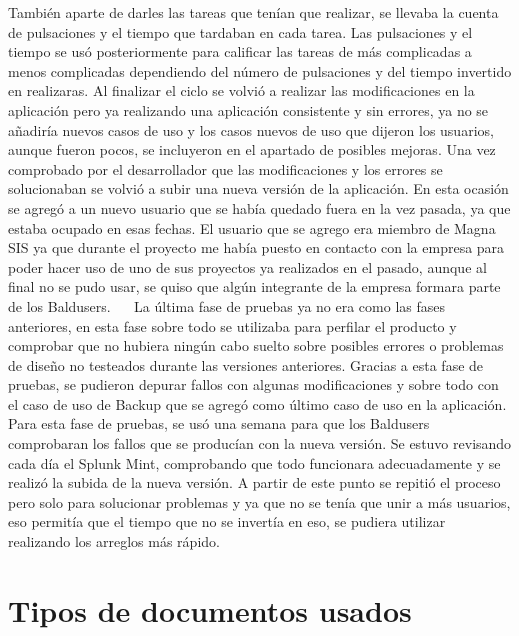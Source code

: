 También aparte de darles las tareas que tenían que realizar, se llevaba la cuenta de pulsaciones y el tiempo que tardaban en cada tarea.
Las pulsaciones y el tiempo se usó posteriormente para calificar las tareas de más complicadas a menos complicadas dependiendo del número de pulsaciones y del tiempo invertido en realizaras.
Al finalizar el ciclo se volvió a realizar las modificaciones en la aplicación pero ya realizando una aplicación consistente y sin errores, ya no se añadiría nuevos casos de uso y los casos nuevos de uso que dijeron los usuarios, aunque fueron pocos, se incluyeron en el apartado de posibles mejoras.
Una vez comprobado por el desarrollador que las modificaciones y los errores se solucionaban se volvió a subir una nueva versión de la aplicación. En esta ocasión se agregó a un nuevo usuario que se había quedado fuera en la vez pasada, ya que estaba ocupado en esas fechas.
El usuario que se agrego era miembro de Magna SIS ya que durante el proyecto me había puesto en contacto con la empresa para poder hacer uso de uno de sus proyectos ya realizados en el pasado, aunque al final no se pudo usar, se quiso que algún integrante de la empresa formara parte de los Baldusers.
 
La última fase de pruebas ya no era como las fases anteriores, en esta fase sobre todo se utilizaba para perfilar el producto y comprobar que no hubiera ningún cabo suelto sobre posibles errores o problemas de diseño no testeados durante las versiones anteriores.
Gracias a esta fase de pruebas, se pudieron depurar fallos con algunas modificaciones y sobre todo con el caso de uso de Backup que se agregó como último caso de uso en la aplicación.
Para esta fase de pruebas, se usó una semana para que los Baldusers comprobaran los fallos que se producían con la nueva versión.
Se estuvo revisando cada día el Splunk Mint, comprobando que todo funcionara adecuadamente y se realizó la subida de la nueva versión.
A partir de este punto se repitió el proceso pero solo para solucionar problemas y ya que no se tenía que unir a más usuarios, eso permitía que el tiempo que no se invertía en eso, se pudiera utilizar realizando los arreglos más rápido.



\section{Tipos de documentos usados}
\label{secc:tipos de documentos usados}

